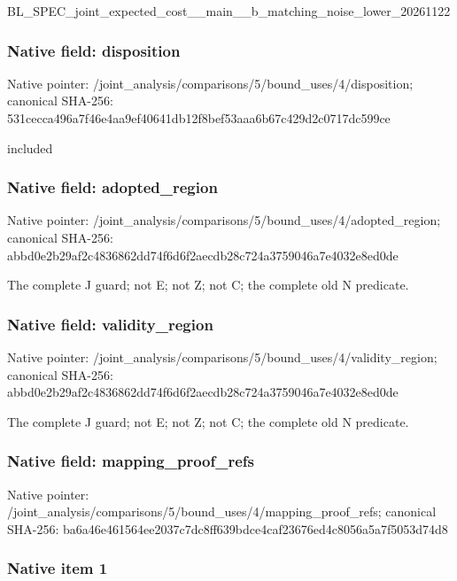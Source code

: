 \documentclass[10pt,a4paper]{article}
\begin{document}
BL\_SPEC\_joint\_expected\_c\allowbreak{}ost\_\_main\_\_b\_matching\_no\allowbreak{}ise\_lower\_20261122


\subsubsection{Native field: disposition}


Native pointer: /joint\_analysis/comparis\allowbreak{}ons/5/bound\_uses/4/dispo\allowbreak{}sition; canonical SHA-256: 531cecca496a7f46e4aa9ef4\allowbreak{}0641db12f8bef53aaa6b67c4\allowbreak{}29d2c0717dc599ce


included


\subsubsection{Native field: adopted\_region}


Native pointer: /joint\_analysis/comparis\allowbreak{}ons/5/bound\_uses/4/adopt\allowbreak{}ed\_region; canonical SHA-256: abbd0e2b29af2c4836862dd7\allowbreak{}4f6d6f2aecdb28c724a37590\allowbreak{}46a7e4032e8ed0de


The complete J guard; not E; not Z; not C; the complete old N predicate.


\subsubsection{Native field: validity\_region}


Native pointer: /joint\_analysis/comparis\allowbreak{}ons/5/bound\_uses/4/valid\allowbreak{}ity\_region; canonical SHA-256: abbd0e2b29af2c4836862dd7\allowbreak{}4f6d6f2aecdb28c724a37590\allowbreak{}46a7e4032e8ed0de


The complete J guard; not E; not Z; not C; the complete old N predicate.


\subsubsection{Native field: mapping\_proof\_refs}


Native pointer: /joint\_analysis/comparis\allowbreak{}ons/5/bound\_uses/4/mappi\allowbreak{}ng\_proof\_refs; canonical SHA-256: ba6a46e461564ee2037c7dc8\allowbreak{}ff639bdce4caf23676ed4c80\allowbreak{}56a5a7f5053d74d8



\subsubsection{Native item 1}
\end{document}

